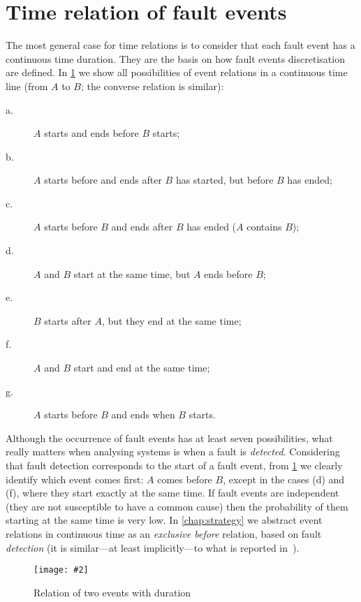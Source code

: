 \documentclass[12pt,openright,twoside,a4paper,oldfontcommands,english,brazil,final]{abntex2}
\theoremstyle{theo}
\newcommand{\includegraphicsaspectratio}[2][1]{%
  \texttt{[image: \#2]}%
}
\begin{document}
\section{Time relation of fault events}
\label{sec:time-relations}

The most general case for time relations is to consider that each fault event has a continuous time duration.
They are the basis on how fault events discretisation are defined.
In \cref{fig:time-relations} we show all possibilities of event relations in a continuous time line (from $A$ to $B$; the converse relation is similar):

\begin{description}
  \item[a.] $A$ starts and ends before $B$ starts;
  \item[b.] $A$ starts before and ends after $B$ has started, but before $B$ has ended;
  \item[c.] $A$ starts before $B$ and ends after $B$ has ended ($A$ contains $B$);
  \item[d.] $A$ and $B$ start at the same time, but $A$ ends before $B$;
  \item[e.] $B$ starts after $A$, but they end at the same time;
  \item[f.] $A$ and $B$ start and end at the same time;
  \item[g.] $A$ starts before $B$ and ends when $B$ starts.
\end{description}

Although the occurrence of fault events has at least seven possibilities, what really matters when analysing systems is when a fault is \emph{detected}.
Considering that fault detection corresponds to the start of a fault event, from \cref{fig:time-relations} we clearly identify which event comes first: $A$ comes before $B$, except in the cases (d) and (f), where they start exactly at the same time.
If fault events are independent (they are not susceptible to have a common cause) then the probability of them starting at the same time is very low.
In \cref{chap:strategy} we abstract event relations in continuous time as an \emph{exclusive before} relation, based on fault \emph{detection} (it is similar---at least implicitly---to what is reported in~\cite{WP2009,MRL2011}).


\begin{figure}[htb]
  \centering
  \includegraphicsaspectratio[0.5]{time-relations}
  \caption{Relation of two events with duration}
  \label{fig:time-relations}
\end{figure}
\end{document}
